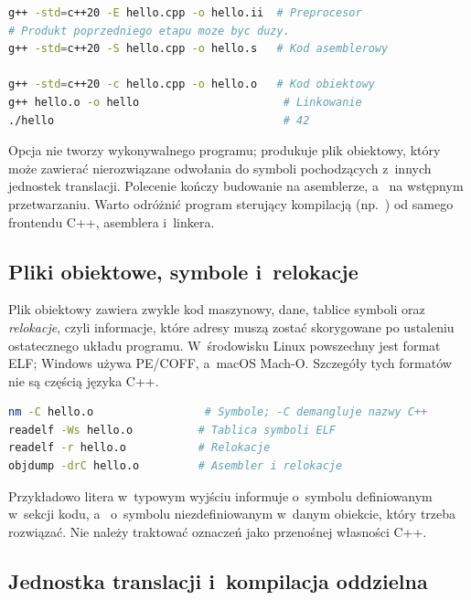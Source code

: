 \begin{lstlisting}[language=bash,caption={Wybrane etapy budowania przy uzyciu GCC/Clang.}]
g++ -std=c++20 -E hello.cpp -o hello.ii  # Preprocesor
# Produkt poprzedniego etapu moze byc duzy.
g++ -std=c++20 -S hello.cpp -o hello.s   # Kod asemblerowy

g++ -std=c++20 -c hello.cpp -o hello.o   # Kod obiektowy
g++ hello.o -o hello                      # Linkowanie
./hello                                   # 42
\end{lstlisting}

Opcja  nie tworzy wykonywalnego programu; produkuje plik
obiektowy, który może zawierać nierozwiązane odwołania do symboli
pochodzących z~innych jednostek translacji. Polecenie 
kończy budowanie na asemblerze, a~ na wstępnym przetwarzaniu.
Warto odróżnić program sterujący kompilacją (np.~) od samego
frontendu C++, asemblera i~linkera.

\subsection{Pliki obiektowe, symbole i~relokacje}

Plik obiektowy zawiera zwykle kod maszynowy, dane, tablice symboli
oraz \emph{relokacje}, czyli informacje, które adresy muszą zostać
skorygowane po ustaleniu ostatecznego układu programu. W~środowisku
Linux powszechny jest format ELF; Windows używa PE/COFF, a~macOS
Mach-O. Szczegóły tych formatów nie są częścią języka C++.

\begin{lstlisting}[language=bash,caption={Ogladanie symboli i relokacji (Linux/ELF).}]
nm -C hello.o                 # Symbole; -C demangluje nazwy C++
readelf -Ws hello.o          # Tablica symboli ELF
readelf -r hello.o           # Relokacje
objdump -drC hello.o         # Asembler i relokacje
\end{lstlisting}

Przykładowo litera  w~typowym wyjściu  informuje
o~symbolu definiowanym w~sekcji kodu, a~ o~symbolu
niezdefiniowanym w~danym obiekcie, który trzeba rozwiązać. Nie
należy traktować oznaczeń  jako przenośnej własności C++.

\subsection{Jednostka translacji i~kompilacja oddzielna}

